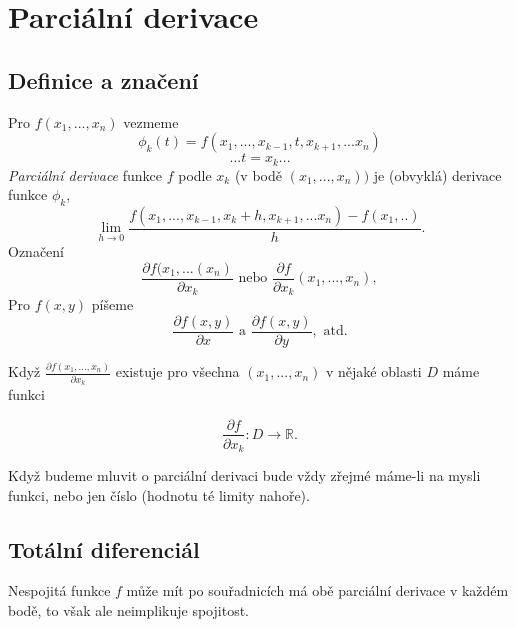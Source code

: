 \documentclass[10pt]{article}
\begin{document}
\noindent

\section{Parciální derivace}

\subsection{Definice a značení}
\hspace{1.2mm}
\noindent

\hspace{1.2mm}
Pro $f(x_1,...,x_n)$ vezmeme 
\[\phi_k(t) = f(x_1,...,x_{k-1},t,x_{k+1},...x_n)\]
\[... t = x_k...\]
\hspace{1.2mm}
\textit{Parciální derivace} funkce $f$ podle $x_k$ (v bodě $(x_1,...,x_n))$ je (obvyklá) derivace funkce $\phi_k$,
\[\lim_{h\rightarrow 0}\frac{f(x_1,...,x_{k-1},x_k+h,x_{k+1},...x_n) - f(x_1,..)}{h}.\]
\hspace{1.2mm}
Označení
\[\frac{\partial f(x_1,...(x_n)}{\partial x_k} \textrm{ nebo } \frac{\partial f}{\partial x_k} (x_1,...,x_n),\]
\hspace{1.2mm}
Pro $f(x,y)$ píšeme
\[\frac{\partial f(x,y)}{\partial x} \textrm{ a } \frac{\partial f(x,y)}{\partial y}, \textrm{ atd.}\]

\hspace{1.2mm}
Když $\frac{\partial f(x_1,...,x_n)}{\partial x_k}$ existuje pro všechna $(x_1,...,x_n)$ v nějaké oblasti $D$ máme funkci

\[\frac{\partial f}{\partial x_k}: D \rightarrow \mathbb{R}.\]

\hspace{1.2mm}
Když budeme mluvit o parciální derivaci bude vždy zřejmé máme-li na mysli funkci, nebo jen číslo (hodnotu té limity nahoře).
\noindent

\subsection{Totální diferenciál}
\hspace{1.2mm}
Nespojitá funkce $f$ může mít po souřadnicích má obě parciální derivace v každém bodě, to však ale neimplikuje spojitost.
\end{document}
